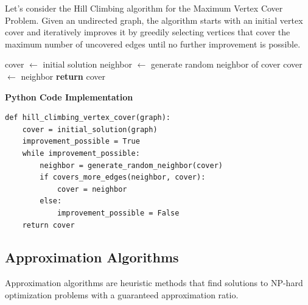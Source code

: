 \documentclass[12pt]{book} %
\begin{document}
Let's consider the Hill Climbing algorithm for the Maximum Vertex Cover Problem. Given an undirected graph, the algorithm starts with an initial vertex cover and iteratively improves it by greedily selecting vertices that cover the maximum number of uncovered edges until no further improvement is possible.
\FloatBarrier
\begin{algorithm}
\caption{Hill Climbing for Maximum Vertex Cover}\label{hill_climbing_vc}
\begin{algorithmic}[1]
\State cover $\gets$ initial solution
    \State neighbor $\gets$ generate random neighbor of cover
        \State cover $\gets$ neighbor
    \EndIf
\EndWhile
\State \textbf{return} cover
\EndProcedure
\end{algorithmic}
\end{algorithm}

\FloatBarrier
\textbf{Python Code Implementation}
\begin{lstlisting}
def hill_climbing_vertex_cover(graph):
    cover = initial_solution(graph)
    improvement_possible = True
    while improvement_possible:
        neighbor = generate_random_neighbor(cover)
        if covers_more_edges(neighbor, cover):
            cover = neighbor
        else:
            improvement_possible = False
    return cover
\end{lstlisting}
\FloatBarrier

\subsection{Approximation Algorithms}

Approximation algorithms are heuristic methods that find solutions to NP-hard optimization problems with a guaranteed approximation ratio.
\end{document}
